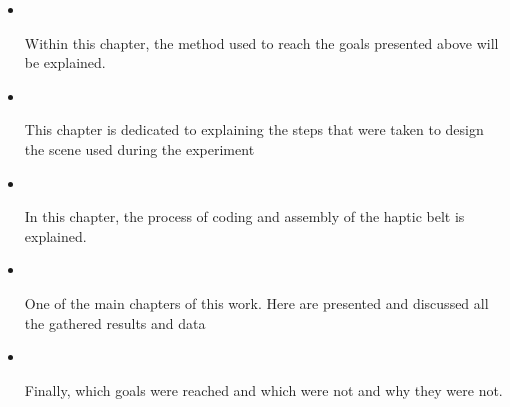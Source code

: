 \begin{itemize}
    \item {\large\textbf{{~}}}
    
        Within this chapter, the method used to reach the goals presented above will be explained.
    
    \item {\large\textbf{{~}}}
        
        This chapter is dedicated to explaining the steps that were taken to design the scene used during the experiment
        
    \item {\large\textbf{{~}}}
        
        In this chapter, the process of coding and assembly of the haptic belt is explained.
        
    \item {\large\textbf{{~}}}
    
        One of the main chapters of this work. Here are presented and discussed all the gathered results and data
    
    \item {\large\textbf{{~}}}
    
        Finally, which goals were reached and which were not and why they were not.
    
\end{itemize}


